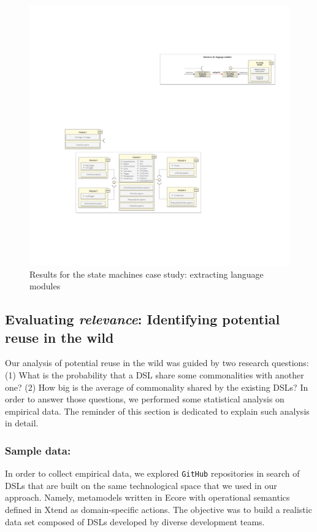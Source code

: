 \begin{figure}
\centering
\includegraphics[width=1\linewidth]{images/puzzle-modularization.pdf}
\caption{Results for the state machines case study: extracting language modules}
\label{fig:puzzle-modularization}
\end{figure}

\subsection{Evaluating \textit{relevance}: Identifying potential reuse in the wild}

Our analysis of potential reuse in the wild was guided by two research questions: (1) What is the probability that a DSL share some commonalities with another one? (2) How big is the average of commonality shared by the existing DSLs? In order to answer those questions, we performed some statistical analysis on empirical data. The reminder of this section is dedicated to explain such analysis in detail. 

\vspace{-3mm}
\subsubsection{Sample data:} In order to collect empirical data, we explored \texttt{GitHub} repositories in search of DSLs that are built on the same technological space that we used in our approach. Namely, metamodels written in Ecore with operational semantics defined in Xtend as domain-specific actions. The objective was to build a realistic data set composed of DSLs developed by diverse development teams. 

